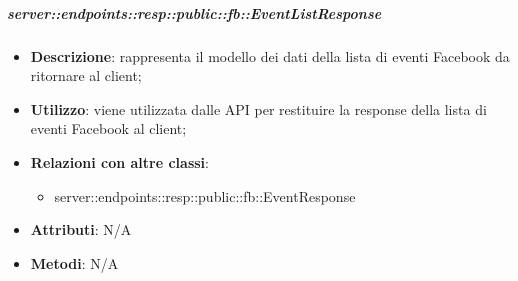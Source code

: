     \subparagraph{server::endpoints::resp::public::fb::EventListResponse} %
    \label{subp:bdsm_app_server_endpoints_resp_public_fb_eventlistresponse}
    \begin{itemize}
      \item \textbf{Descrizione}: rappresenta il modello dei dati della lista di eventi Facebook da ritornare al client;
      \item \textbf{Utilizzo}: viene utilizzata dalle API per restituire la response della lista di eventi Facebook al client;
      \item \textbf{Relazioni con altre classi}:
        \begin{itemize}
          \item server::endpoints::resp::public::fb::EventResponse
        \end{itemize}
    \item \textbf{Attributi}: N/A
    \item \textbf{Metodi}: N/A
      \end{itemize}

